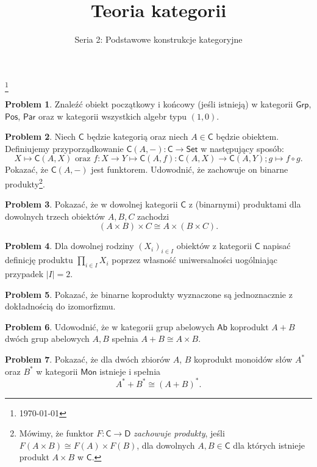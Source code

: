 \documentclass[10pt]{amsart}
\title{Teoria kategorii}
\author{Seria 2: Podstawowe konstrukcje kategoryjne}
\theoremstyle{plain}
\theoremstyle{definition}
\newtheorem{problem}{Problem}
\numberwithin{equation}{section}
\newcommand\blfootnote[1]{%
  \begingroup
  \renewcommand\thefootnote{}\footnote{#1}%
  \addtocounter{footnote}{-1}%
  \endgroup
}
\begin{document}
\maketitle

\blfootnote{\today}


\begin{problem}
Znaleźć obiekt początkowy i końcowy (jeśli istnieją) w kategorii 
$\mathsf{Grp}$, $\mathsf{Pos}$, $\mathsf{Par}$ oraz w kategorii wszystkich algebr typu $(1,0)$. 
\end{problem}



\begin{problem}
Niech $\mathsf{C}$ będzie kategorią oraz niech $A\in \mathsf{C}$ będzie obiektem. Definiujemy przyporządkowanie $\mathsf{C}(A,-):\mathsf{C}\to \mathsf{Set}$ w następujący sposób:
$$
X\mapsto \mathsf{C}(A,X) \text{ oraz } f:X\to Y \mapsto \mathsf{C}(A,f):\mathsf{C}(A,X)\to \mathsf{C}(A,Y);g\mapsto f\circ g. 
$$
Pokazać, że $\mathsf{C}(A,-)$ jest funktorem. Udowodnić, że zachowuje on binarne produkty\footnote{Mówimy, że funktor $F:\mathsf{C}\to\mathsf{D}$ \emph{zachowuje produkty}, jeśli $F(A\times B) \cong F(A)\times F(B)$, dla dowolnych $A,B\in \mathsf{C}$ dla których istnieje produkt $A\times B$ w $\mathsf{C}$.}. 
\end{problem}

\begin{problem}
Pokazać, że w dowolnej kategorii $\mathsf{C}$ z (binarnymi) produktami dla dowolnych trzech obiektów $A,B,C$ zachodzi
$$
(A\times B)\times C \cong A\times (B\times C).
$$
\end{problem}

\begin{problem}
Dla dowolnej rodziny $(X_i)_{i\in I}$ obiektów z kategorii $\mathsf{C}$ napisać definicję produktu
$\prod_{i\in I} X_i$ poprzez własność uniwersalności uogólniając przypadek $|I|=2$.
\end{problem}

\begin{problem}
Pokazać, że binarne koprodukty wyznaczone są jednoznacznie z dokładnością do izomorfizmu.
\end{problem}


\begin{problem}
Udowodnić, że w kategorii grup abelowych $\mathsf{Ab}$ koprodukt $A+B$ dwóch grup abelowych $A,B$ spełnia $A+B \cong A\times B$.  
\end{problem}

\begin{problem}
Pokazać, że dla dwóch zbiorów $A$, $B$ koprodukt monoidów słów $A^\ast$ oraz $B^\ast$ w kategorii $\mathsf{Mon}$ istnieje i spełnia 
$$
A^\ast + B^\ast \cong (A+B)^\ast.
$$
\end{problem}
\end{document}
